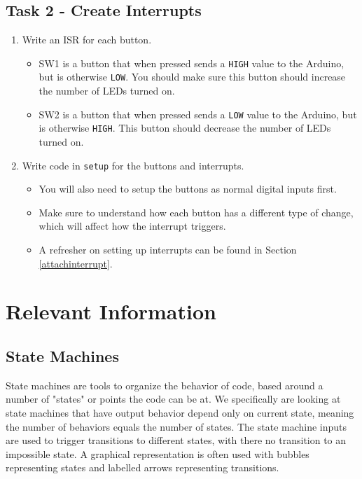 \documentclass{article}
\begin{document}
    \subsection{Task 2 - Create Interrupts}
        \begin{enumerate}
            \item Write an ISR for each button.
            \begin{itemize}
                \item SW1 is a button that when pressed sends a \texttt{HIGH} value to the Arduino, but is otherwise \texttt{LOW}. You should make sure this button should increase the number of LEDs turned on. 
                \item SW2 is a button that when pressed sends a \texttt{LOW} value to the Arduino, but is otherwise \texttt{HIGH}. This button should decrease the number of LEDs turned on.
            \end{itemize}
            \item Write code in \texttt{setup} for the buttons and interrupts.
            \begin{itemize}
                \item You will also need to setup the buttons as normal digital inputs first. 
                \item Make sure to understand how each button has a different type of change, which will affect how the interrupt triggers.
                \item A refresher on setting up interrupts can be found in Section \ref{attachinterrupt}.
            \end{itemize}
        \end{enumerate}
        
\section{Relevant Information}
    \subsection{State Machines} \label{statemachine}
        State machines are tools to organize the behavior of code, based around a number of "states" or points the code can be at. We specifically are looking at state machines that have output behavior depend only on current state, meaning the number of behaviors equals the number of states. The state machine inputs are used to trigger transitions to different states, with there no transition to an impossible state. A graphical representation is often used with bubbles representing states and labelled arrows representing transitions.
        
\end{document}
